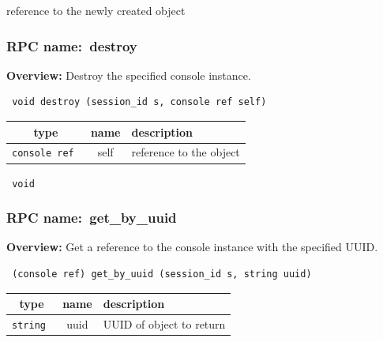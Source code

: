 reference to the newly created object
\vspace{0.3cm}
\vspace{0.3cm}
\vspace{0.3cm}
\subsubsection{RPC name:~destroy}

{\bf Overview:} 
Destroy the specified console instance.

\begin{verbatim} void destroy (session_id s, console ref self)\end{verbatim}



 
\vspace{0.3cm}
\begin{tabular}{|c|c|p{7cm}|}
 \hline
{\bf type} & {\bf name} & {\bf description} \\ \hline
{\tt console ref } & self & reference to the object \\ \hline 

\end{tabular}

\vspace{0.3cm}

{\tt 
void
}



\vspace{0.3cm}
\vspace{0.3cm}
\vspace{0.3cm}
\subsubsection{RPC name:~get\_by\_uuid}

{\bf Overview:} 
Get a reference to the console instance with the specified UUID.

\begin{verbatim} (console ref) get_by_uuid (session_id s, string uuid)\end{verbatim}



 
\vspace{0.3cm}
\begin{tabular}{|c|c|p{7cm}|}
 \hline
{\bf type} & {\bf name} & {\bf description} \\ \hline
{\tt string } & uuid & UUID of object to return \\ \hline 

\end{tabular}

